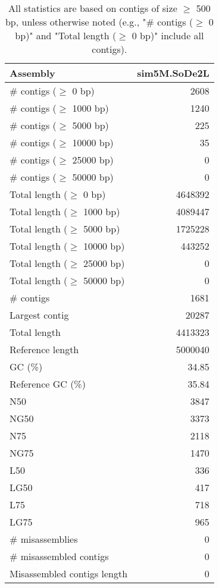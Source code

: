 \documentclass[12pt,a4paper]{article}
\begin{document}
\begin{table}[ht]
\begin{center}
\caption{All statistics are based on contigs of size $\geq$ 500 bp, unless otherwise noted (e.g., "\# contigs ($\geq$ 0 bp)" and "Total length ($\geq$ 0 bp)" include all contigs).}
\begin{tabular}{|l*{1}{|r}|}
\hline
Assembly & sim5M.SoDe2L \\ \hline
\# contigs ($\geq$ 0 bp) & 2608 \\ \hline
\# contigs ($\geq$ 1000 bp) & 1240 \\ \hline
\# contigs ($\geq$ 5000 bp) & 225 \\ \hline
\# contigs ($\geq$ 10000 bp) & 35 \\ \hline
\# contigs ($\geq$ 25000 bp) & 0 \\ \hline
\# contigs ($\geq$ 50000 bp) & 0 \\ \hline
Total length ($\geq$ 0 bp) & 4648392 \\ \hline
Total length ($\geq$ 1000 bp) & 4089447 \\ \hline
Total length ($\geq$ 5000 bp) & 1725228 \\ \hline
Total length ($\geq$ 10000 bp) & 443252 \\ \hline
Total length ($\geq$ 25000 bp) & 0 \\ \hline
Total length ($\geq$ 50000 bp) & 0 \\ \hline
\# contigs & 1681 \\ \hline
Largest contig & 20287 \\ \hline
Total length & 4413323 \\ \hline
Reference length & 5000040 \\ \hline
GC (\%) & 34.85 \\ \hline
Reference GC (\%) & 35.84 \\ \hline
N50 & 3847 \\ \hline
NG50 & 3373 \\ \hline
N75 & 2118 \\ \hline
NG75 & 1470 \\ \hline
L50 & 336 \\ \hline
LG50 & 417 \\ \hline
L75 & 718 \\ \hline
LG75 & 965 \\ \hline
\# misassemblies & 0 \\ \hline
\# misassembled contigs & 0 \\ \hline
Misassembled contigs length & 0 \\ \hline

\end{tabular}
\end{center}
\end{table}
\end{document}
